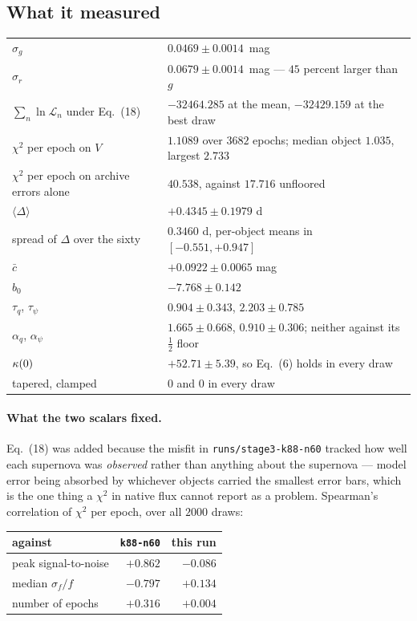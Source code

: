 \documentclass[11pt]{article}
\newcommand{\file}[1]{\texttt{#1}}
\begin{document}
\subsection{What it measured}

\begin{tabular}{@{}l l@{}}
\toprule
$\sigma_{g}$ & $0.0469 \pm 0.0014$~mag \\
$\sigma_{r}$ & $0.0679 \pm 0.0014$~mag --- $45$ percent larger than $g$ \\
$\sum_{n}\ln\mathcal{L}_{n}$ under Eq.~(18) & $-32464.285$ at the mean, $-32429.159$ at the best draw \\
$\chi^{2}$ per epoch on $V$ & $1.1089$ over $3682$ epochs; median object $1.035$, largest $2.733$ \\
$\chi^{2}$ per epoch on archive errors alone & $40.538$, against $17.716$ unfloored \\
$\langle\Delta\rangle$ & $+0.4345 \pm 0.1979$ d \\
spread of $\Delta$ over the sixty & $0.3460$ d, per-object means in $[-0.551, +0.947]$ \\
$\bar c$ & $+0.0922 \pm 0.0065$ mag \\
$b_{0}$ & $-7.768 \pm 0.142$ \\
$\tau_{q}$, $\tau_{\psi}$ & $0.904 \pm 0.343$, $2.203 \pm 0.785$ \\
$\alpha_{q}$, $\alpha_{\psi}$ & $1.665 \pm 0.668$, $0.910 \pm 0.306$; neither against its $\tfrac12$ floor \\
$\kappa(0)$ & $+52.71 \pm 5.39$, so Eq.~(6) holds in every draw \\
tapered, clamped & $0$ and $0$ in every draw \\
\bottomrule
\end{tabular}

\paragraph{What the two scalars fixed.} Eq.~(18) was added because the misfit in
\file{runs/stage3-k88-n60} tracked how well each supernova was \emph{observed} rather than
anything about the supernova --- model error being absorbed by whichever objects carried
the smallest error bars, which is the one thing a $\chi^{2}$ in native flux cannot report
as a problem. Spearman's correlation of $\chi^{2}$ per epoch, over all $2000$ draws:

\medskip
\begin{tabular}{@{}l r r@{}}
\toprule
against & \file{k88-n60} & this run \\
\midrule
peak signal-to-noise & $+0.862$ & $-0.086$ \\
median $\sigma_{f}/f$ & $-0.797$ & $+0.134$ \\
number of epochs & $+0.316$ & $+0.004$ \\
\bottomrule
\end{tabular}
\end{document}
